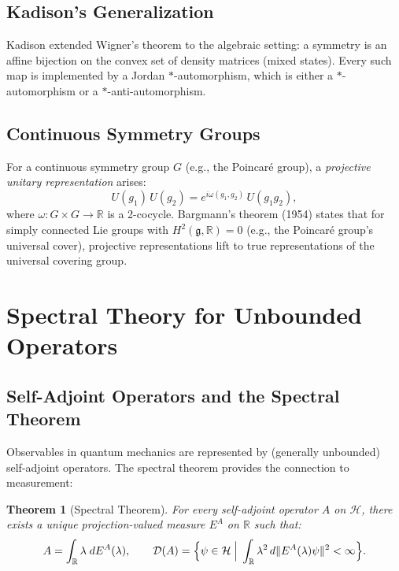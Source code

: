 \documentclass[11pt,a4paper]{article}
\newtheorem{theorem}{Theorem}[section]
\begin{document}
\subsection{Kadison's Generalization}

Kadison extended Wigner's theorem to the algebraic setting: a symmetry
is an affine bijection on the convex set of density matrices (mixed states).
Every such map is implemented by a Jordan $*$-automorphism, which is either
a $*$-automorphism or a $*$-anti-automorphism.

\subsection{Continuous Symmetry Groups}

For a continuous symmetry group $G$ (e.g., the Poincar\'e group), a
\emph{projective unitary representation} arises:
\begin{equation}
  U(g_1)\, U(g_2) = e^{i\omega(g_1, g_2)}\, U(g_1 g_2),
\end{equation}
where $\omega: G \times G \to \mathbb{R}$ is a 2-cocycle. Bargmann's theorem
(1954) states that for simply connected Lie groups with $H^2(\mathfrak{g}, \mathbb{R}) = 0$
(e.g., the Poincar\'e group's universal cover), projective representations
lift to true representations of the universal covering group.

\section{Spectral Theory for Unbounded Operators}

\subsection{Self-Adjoint Operators and the Spectral Theorem}

Observables in quantum mechanics are represented by (generally unbounded)
self-adjoint operators. The spectral theorem provides the connection to
measurement:

\begin{theorem}[Spectral Theorem]
For every self-adjoint operator $A$ on $\mathcal{H}$, there exists a unique
projection-valued measure $E^A$ on $\mathbb{R}$ such that:
\begin{equation}
  A = \int_{\mathbb{R}} \lambda\; dE^A(\lambda),
  \qquad \mathcal{D}(A) = \Bigl\{\psi \in \mathcal{H} \;\Big|\;
  \int_{\mathbb{R}} \lambda^2\, d\|E^A(\lambda)\psi\|^2 < \infty\Bigr\}.
\end{equation}
\end{theorem}
\end{document}
